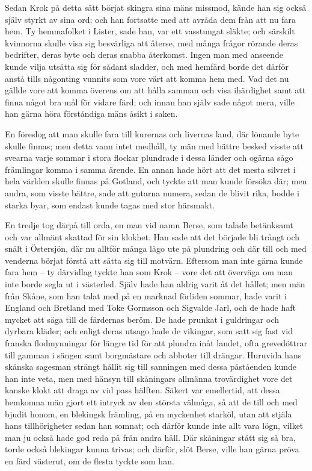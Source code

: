\initial Sedan Krok på detta sätt börjat skingra sina mäns missmod, kände han sig också själv styrkt av sina ord; och han fortsatte med att avråda dem från att nu fara hem. Ty hemmafolket i Lister, sade han, var ett vasstungat släkte; och särskilt kvinnorna skulle visa sig besvärliga att återse, med många frågor rörande deras bedrifter, deras byte och deras snabba återkomst. Ingen man med anseende kunde vilja utsätta sig för sådant sladder, och med hemfärd borde det därför anstå tills någonting vunnits som vore värt att komma hem med. Vad det nu gällde vore att komma överens om att hålla samman och visa ihärdighet samt att finna något bra mål för vidare färd; och innan han själv sade något mera, ville han gärna höra förståndiga mäns åsikt i saken.

\initial En föreslog att man skulle fara till kurernas och livernas land, där lönande byte skulle finnas; men detta vann intet medhåll, ty män med bättre besked visste att svearna varje sommar i stora flockar plundrade i dessa länder och ogärna sågo främlingar komma i samma ärende. En annan hade hört att det mesta silvret i hela världen skulle finnas på Gotland, och tyckte att man kunde försöka där; men andra, som visste bättre, sade att gutarna numera, sedan de blivit rika, bodde i starka byar, som endast kunde tagas med stor härsmakt.

\initial En tredje tog därpå till orda, en man vid namn Berse, som talade betänksamt och var allmänt skattad för sin klokhet. Han sade att det började bli trångt och snålt i Östersjön, där nu alltför många lågo ute på plundring och där till och med venderna börjat förstå att sätta sig till motvärn. Eftersom man inte gärna kunde fara hem – ty därvidlag tyckte han som Krok – vore det att överväga om man inte borde segla ut i västerled. Själv hade han aldrig varit åt det hållet; men män från Skåne, som han talat med på en marknad förliden sommar, hade varit i England och Bretland med Toke Gormsson och Sigvalde Jarl, och de hade haft mycket att säga till de färdernas beröm. De hade prunkat i guldringar och dyrbara kläder; och enligt deras utsago hade de vikingar, som satt sig fast vid franska flodmynningar för längre tid för att plundra inåt landet, ofta grevedöttrar till gamman i sängen samt borgmästare och abboter till drängar. Huruvida hans skånska sagesman strängt hållit sig till sanningen med dessa påståenden kunde han inte veta, men med hänsyn till skåningars allmänna trovärdighet vore det kanske klokt att draga av vid pass hälften. Säkert var emellertid, att dessa hemkomna män gjort ett intryck av den största välmåga, så att de till och med bjudit honom, en blekingsk främling, på en myckenhet starköl, utan att stjäla hans tillhörigheter sedan han somnat; och därför kunde inte allt vara lögn, vilket man ju också hade god reda på från andra håll. Där skåningar stått sig så bra, torde också blekingar kunna trivas; och därför, slöt Berse, ville han gärna pröva en färd västerut, om de flesta tyckte som han.

